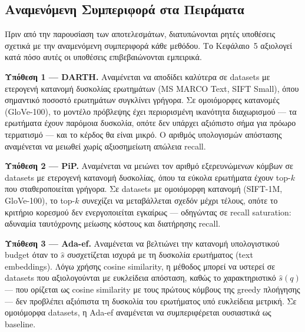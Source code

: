 \documentclass[12pt,a4paper]{article}
\begin{document}
\subsection{Αναμενόμενη Συμπεριφορά στα Πειράματα}
Πριν από την παρουσίαση των αποτελεσμάτων, διατυπώνονται ρητές υποθέσεις σχετικά με την αναμενόμενη συμπεριφορά κάθε μεθόδου. Το Κεφάλαιο~5 αξιολογεί κατά πόσο αυτές οι υποθέσεις επιβεβαιώνονται εμπειρικά.

\textbf{Υπόθεση 1 — DARTH.}
Αναμένεται να αποδίδει καλύτερα σε datasets με ετερογενή κατανομή δυσκολίας ερωτημάτων (MS MARCO Text, SIFT Small), όπου σημαντικό ποσοστό ερωτημάτων συγκλίνει γρήγορα. Σε ομοιόμορφες κατανομές (GloVe-100), το μοντέλο πρόβλεψης έχει περιορισμένη ικανότητα διαχωρισμού --- τα ερωτήματα έχουν παρόμοια δυσκολία, οπότε δεν υπάρχει αξιόπιστο σήμα για πρόωρο τερματισμό --- και το κέρδος θα είναι μικρό. Ο αριθμός υπολογισμών απόστασης αναμένεται να μειωθεί χωρίς αξιοσημείωτη απώλεια recall.

\textbf{Υπόθεση 2 — PiP.}
Αναμένεται να μειώνει τον αριθμό εξερευνώμενων κόμβων σε datasets με ετερογενή κατανομή δυσκολίας, όπου τα εύκολα ερωτήματα έχουν top-$k$ που σταθεροποιείται γρήγορα. Σε datasets με ομοιόμορφη κατανομή (SIFT-1M, GloVe-100), το top-$k$ συνεχίζει να μεταβάλλεται σχεδόν μέχρι τέλους, οπότε το κριτήριο κορεσμού δεν ενεργοποιείται εγκαίρως --- οδηγώντας σε recall saturation: αδυναμία ταυτόχρονης μείωσης κόστους και διατήρησης recall.

\textbf{Υπόθεση 3 — Ada-ef.}
Αναμένεται να βελτιώνει την κατανομή υπολογιστικού budget όταν το $\hat{s}$ συσχετίζεται ισχυρά με τη δυσκολία ερωτήματος (text embeddings). Λόγω χρήσης cosine similarity, η μέθοδος μπορεί να υστερεί σε datasets που αξιολογούνται με ευκλείδεια απόσταση, καθώς το χαρακτηριστικό $\hat{s}(q)$ --- που ορίζεται ως cosine similarity με τους πρώτους κόμβους της greedy πλοήγησης --- δεν προβλέπει αξιόπιστα τη δυσκολία του ερωτήματος υπό ευκλείδεια μετρική. Σε ομοιόμορφα datasets, η Ada-ef αναμένεται να συμπεριφέρεται ουσιαστικά ως baseline.
\end{document}
